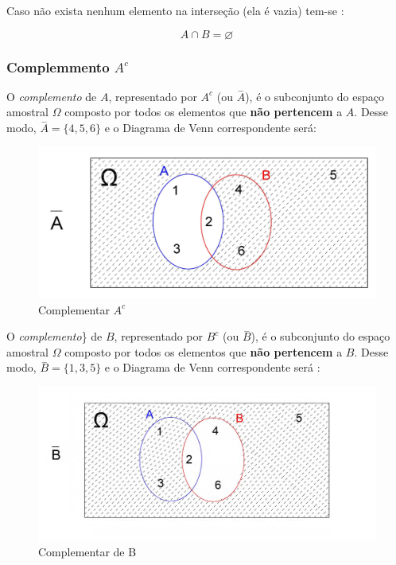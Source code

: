 \documentclass[
]{book}
\begin{document}
\hfill\break

Caso não exista nenhum elemento na interseção (ela é vazia) tem-se :

\[
A \cap B = \varnothing
\]

\hypertarget{complemmento-ac}{%
\subsubsection{\texorpdfstring{Complemmento \(A^{c}\)}{Complemmento A\^{}\{c\}}}\label{complemmento-ac}}

O \emph{complemento} de \(A\), representado por \(A^{c}\) (ou \(\stackrel{-}{A}\)), é o subconjunto do espaço amostral \(\Omega\) composto por todos os elementos que \textbf{não pertencem} a \(A\). Desse modo, \(\stackrel{-}{A} =\{4,5,6\}\) e o Diagrama de Venn correspondente será:

\hfill\break

\begin{figure}

{\centering \includegraphics[width=0.8\linewidth]{images4/COMP_A} 

}

\caption{Complementar  $A^{c}$}\label{fig:unnamed-chunk-54}
\end{figure}

\hfill\break

O \emph{complemento}\} de \(B\), representado por \(B^{c}\) (ou \(\stackrel{-}{B}\)), é o subconjunto do espaço amostral \(\Omega\) composto por todos os elementos que \textbf{não pertencem} a \(B\). Desse modo, \(\stackrel{-}{B} =\{1,3,5\}\) e o Diagrama de Venn correspondente será :

\hfill\break

\begin{figure}

{\centering \includegraphics[width=0.8\linewidth]{images4/COMP_B} 

}

\caption{Complementar de B}\label{fig:unnamed-chunk-55}
\end{figure}
\end{document}
